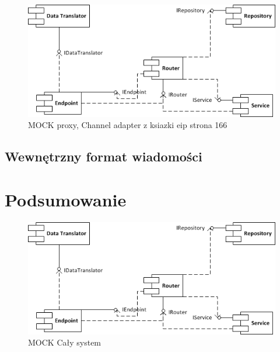 \begin{figure}[!h]
	\centering
	\includegraphics[scale=1.0]{component_uml.png}
	\caption{MOCK proxy, Channel adapter z ksiazki eip strona 166 }\label{fig:channel_adapter.}
\end{figure}




\subsection{Wewnętrzny format wiadomości}


\section*{Podsumowanie} 

\begin{figure}[!h]
	\centering
	\includegraphics[scale=1.0]{component_uml.png}
	\caption{MOCK Cały system }\label{fig:whole_system}
\end{figure}






